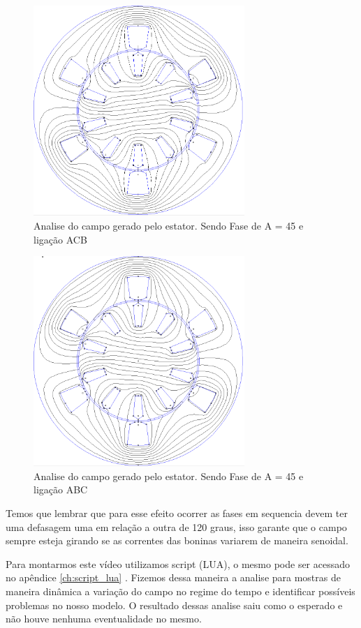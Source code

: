 \documentclass[
	12pt,				%
	openright,			%
	twoside,			%
	a4paper,			%
	english,			%
	french,				%
	spanish,			%
	brazil,				%
	]{abntex2}
\begin{document}
\begin{figure}[H]
    \centering
    \includegraphics[width=8cm]{img/motor_acb_45.png}
    \caption{Analise do campo gerado pelo estator. Sendo Fase de A = 45 e ligação ACB}
    \label{fig:trafo_acb}
\end{figure}

\begin{figure}[H]
    \centering
    \includegraphics[width=8cm]{img/motor_abc_45.png}
    \caption{Analise do campo gerado pelo estator. Sendo Fase de A = 45 e ligação ABC}
    \label{fig:trafo_abc}
\end{figure}

Temos que lembrar que para esse efeito ocorrer as fases em sequencia devem ter uma defasagem uma em relação a outra de 120 graus, isso garante que o campo sempre esteja girando se as correntes das boninas variarem de maneira senoidal.

Para montarmos este vídeo utilizamos script (LUA), o mesmo pode ser acessado no apêndice \ref{ch:script_lua} . Fizemos dessa maneira a analise para mostras de maneira dinâmica a variação do campo no regime do tempo e identificar possíveis problemas no nosso modelo. O resultado dessas analise saiu como o esperado e não houve nenhuma eventualidade no mesmo.
\end{document}
